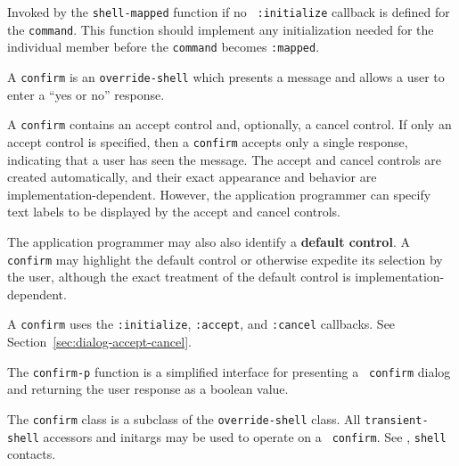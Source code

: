 \begin{flushright} \parbox[t]{6.125in}{
Invoked by the {\tt shell-mapped} function if no {\tt
:initialize} callback is defined for the {\tt command}.
This function should implement any initialization needed for the individual
member before the {\tt command} becomes {\tt :mapped}.

}\end{flushright}



\vfill
\pagebreak


A {\tt confirm} is an {\tt override-shell} which presents a message and allows
a user to enter a ``yes or no'' response. 

A {\tt confirm} contains an accept control and, optionally, a cancel control.
If only an accept control is specified, then a {\tt confirm} accepts only a
single response, indicating that a user has seen the message.  The accept and
cancel controls are created automatically, and their exact appearance and
behavior are implementation-dependent. However, the application programmer can
specify text labels to be displayed by the accept and cancel controls.

The application programmer may also also identify a {\bf default
control}. A {\tt confirm} may highlight the
default control or otherwise expedite its selection by the user, although the
exact treatment of the default control is implementation-dependent.

A {\tt confirm} uses the {\tt :initialize}, {\tt :accept}, and {\tt :cancel}
callbacks. See Section~\ref{sec:dialog-accept-cancel}.

The {\tt confirm-p} function is a simplified interface for presenting a {\tt
confirm} dialog and returning the user response as a boolean value. 


The {\tt confirm} class is a subclass of the {\tt override-shell} class. All
{\tt transient-shell} accessors and initargs may be used to operate on a {\tt
confirm}. See \cite{clue}, {\tt shell} contacts.

